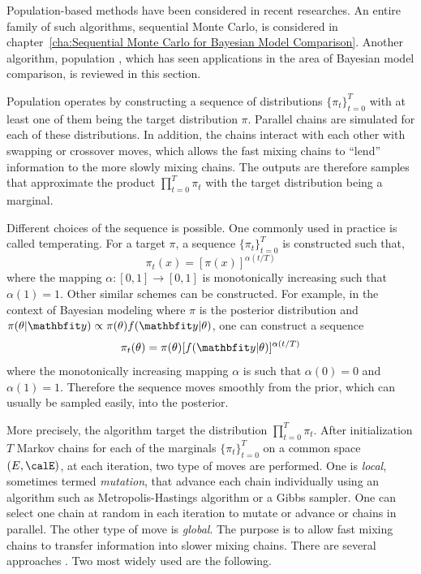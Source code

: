 Population-based methods have been considered in recent researches. An entire
family of such algorithms, sequential Monte Carlo, is considered in
chapter~\ref{cha:Sequential Monte Carlo for Bayesian Model Comparison}.
Another algorithm, population \mcmc, which has seen applications in the area of
Bayesian model comparison, is reviewed in this section.

Population \mcmc operates by constructing a sequence of distributions
$\{\pi_t\}_{t=0}^T$ with at least one of them being the target distribution
$\pi$. Parallel \mcmc chains are simulated for each of these distributions. In
addition, the chains interact with each other with swapping or crossover
moves, which allows the fast mixing chains to ``lend'' information to the more
slowly mixing chains. The outputs are therefore samples that approximate the
product $\prod_{t=0}^T\pi_t$ with the target distribution being a marginal.

Different choices of the sequence is possible. One commonly used in practice
is called temperating. For a target $\pi$, a sequence $\{\pi_t\}_{t=0}^T$ is
constructed such that,
\begin{equation}
  \pi_t(x) = [\pi(x)]^{\alpha(t/T)}
\end{equation}
where the mapping $\alpha:[0,1]\to[0,1]$ is monotonically increasing such that
$\alpha(1) = 1$. Other similar schemes can be constructed. For example, in the
context of Bayesian modeling where $\pi$ is the posterior distribution and
$\pi(\theta|\data) \propto \pi(\theta)f(\data|\theta)$, one can construct a
sequence
\begin{equation}
  \pi_t(\theta) = \pi(\theta)[f(\data|\theta)]^{\alpha(t/T)}
  \label{eq:power post}
\end{equation}
where the monotonically increasing mapping $\alpha$ is such that $\alpha(0) =
0$ and $\alpha(1) = 1$. Therefore the sequence moves smoothly from the prior,
which can usually be sampled easily, into the posterior.

More precisely, the algorithm target the distribution $\prod_{t=0}^T\pi_t$.
After initialization $T$ Markov chains for each of the marginals
$\{\pi_t\}_{t=0}^T$ on a common space $(E,\calE)$, at each iteration, two type
of moves are performed. One is \emph{local}, sometimes termed \emph{mutation},
that advance each chain individually using an \mcmc algorithm such as
Metropolis-Hastings algorithm or a Gibbs sampler. One can select one chain at
random in each iteration to mutate or advance or chains in parallel. The other
type of move is \emph{global}. The purpose is to allow fast mixing chains to
transfer information into slower mixing chains. There are several approaches
\cite{Jasra:2007in}. Two most widely used are the following.

